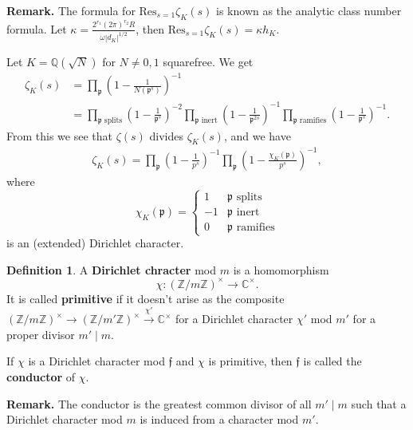 \documentclass{article}
\theoremstyle{definition}
\newtheorem{defn}[theorem]{Definition}
\begin{document}
\textbf{Remark.} The formula for $\text{Res}_{s=1}\zeta_K(s)$ is known as the analytic class number formula. Let $\kappa = \frac{2^{r_1}(2\pi)^{r_2}R}{\omega \left|d_K\right|^{1/2}}$, then $\text{Res}_{s=1} \zeta_K(s) = \kappa h_K$.
\vspace{1mm}
 
Let $K=\mathbb{Q}(\sqrt{N})$ for $N \neq 0,1$ squarefree. We get
\begin{align*}
    \zeta_K(s) &= \prod_{\mathfrak{p}}^{}\left(1-\frac{1}{N(\mathfrak{p}^s)}\right)^{-1} \\ 
    &= \prod_{\mathfrak{p}\text{ splits}}^{} \left(1-\frac{1}{\mathfrak{p}^s}\right)^{-2} \prod_{\mathfrak{p}\text{ inert}}^{} \left(1-\frac{1}{\mathfrak{p}^{2s}}\right)^{-1} \prod_{\mathfrak{p}\text{ ramifies}}^{} \left(1-\frac{1}{\mathfrak{p}^s}\right)^{-1}.
\end{align*}
From this we see that $\zeta(s)$ divides $\zeta_K(s)$, and we have
\begin{align*}
    \zeta_K(s) = \prod_{\mathfrak{p}}^{} \left(1-\frac{1}{p^s}\right)^{-1} \prod_{\mathfrak{p}}^{} \left(1-\frac{\chi_K(\mathfrak{p})}{p^s}\right)^{-1},  
\end{align*}
where \[
\chi_K(\mathfrak{p}) = \begin{cases}
    1 & \mathfrak{p} \text{ splits}\\
    -1 & \mathfrak{p} \text{ inert}\\
    0 & \mathfrak{p} \text{ ramifies}
\end{cases}
\]
is an (extended) Dirichlet character.
\begin{defn}\label{2.26}
    A \textbf{Dirichlet chracter} mod $m$ is a homomorphism $$\chi : (\mathbb{Z}/m\mathbb{Z})^\times \to \mathbb{C}^\times.$$ It is called \textbf{primitive} if it doesn't arise as the composite $\left(\mathbb{Z}/m\mathbb{Z}\right)^\times \to (\mathbb{Z}/m'\mathbb{Z})^\times \stackrel{\chi'}{\to} \mathbb{C}^\times$ for a Dirichlet character $\chi'$ mod $m'$ for a proper divisor $m' \mid m$.

    \vspace{1mm}
     
    If $\chi$ is a Dirichlet character mod $\mathfrak{f}$ and $\chi$ is primitive, then $\mathfrak{f}$ is called the \textbf{conductor} of $\chi$.
\end{defn}
\textbf{Remark.} The conductor is the greatest common divisor of all $m' \mid m$ such that a Dirichlet character mod $m$ is induced from a character mod $m'$.
\vspace{1mm}
 
\end{document}
